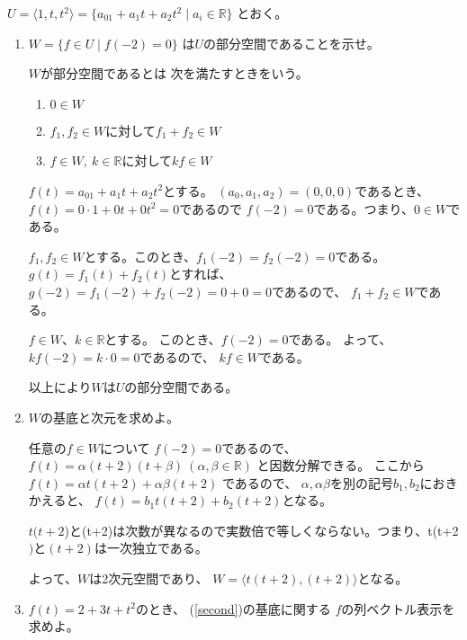 \documentclass[12pt,b5paper]{ltjsarticle}
\begin{document}
$U=\langle 1,t,t^2\rangle=\{a_01+a_1t+a_2t^2 \mid a_i\in\mathbb{R}\}$
とおく。
\begin{enumerate}
 \item
      $W=\{f\in U \mid f(-2)=0 \}$
      は$U$の部分空間であることを示せ。

      \dotfill

      $W$が部分空間であるとは
      次を満たすときをいう。
      \begin{enumerate}
       \item $0\in W$
       \item $f_1,f_2\in W$に対して$f_1+f_2\in W$
       \item $f\in W,\ k\in\mathbb{R}$に対して$kf\in W$
      \end{enumerate}

      \dotfill

      $f(t)=a_01+a_1t+a_2t^2$とする。
      $(a_0,a_1,a_2)=(0,0,0)$であるとき、
      $f(t)=0\cdot1+0t+0t^2=0$であるので
      $f(-2)=0$である。つまり、$0\in W$である。

      $f_1,f_2\in W$とする。このとき、$f_1(-2)=f_2(-2)=0$である。
      $g(t)=f_1(t)+f_2(t)$とすれば、
      $g(-2)=f_1(-2)+f_2(-2)=0+0=0$であるので、
      $f_1+f_2\in W$である。

      $f\in W$、$k\in\mathbb{R}$とする。
      このとき、$f(-2)=0$である。
      よって、$kf(-2)=k\cdot 0=0$であるので、
      $kf\in W$である。

      以上により$W$は$U$の部分空間である。


      \hrulefill

 \item\label{second}
      $W$の基底と次元を求めよ。

      \dotfill

      任意の$f\in W$について
      $f(-2)=0$であるので、
      $f(t)=\alpha(t+2)(t+\beta)\ (\alpha,\beta\in\mathbb{R})$
      と因数分解できる。
      ここから$f(t)=\alpha t(t+2)+\alpha\beta(t+2)$
      であるので、
      $\alpha,\alpha\beta$を別の記号$b_1,b_2$におきかえると、
      $f(t)=b_1t(t+2)+b_2(t+2)$となる。

      $t(t+2$)$と$(t+2)$は次数が異なるので実数倍で等しくならない。
      つまり、$t(t+2$)$と$(t+2)$は一次独立である。

      よって、$W$は2次元空間であり、
      $W=\langle t(t+2),(t+2)\rangle$となる。

      \hrulefill

 \item
      $f(t)=2+3t+t^2$のとき、
      (\ref{second})の基底に関する
      $f$の列ベクトル表示を求めよ。


\end{enumerate}
\end{document}
